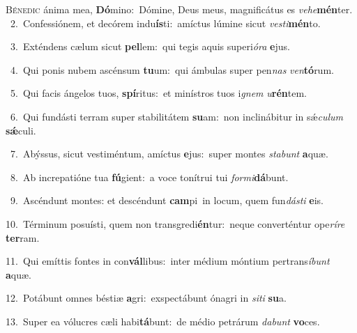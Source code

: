 \lettrine{\initial\textcolor{\initialcolor}{B}}{énedic} ánima mea, \textbf{Dó}\-mino:~\star Dómine, Deus meus, magnificátus es \textit{ve}\-\textit{he}\textbf{mén}ter.\\
{\numbfont\textcolor{\numbcolor}{~2.}}~Confessiónem, et decórem indu\-\textbf{ís}\-ti:~\star amíctus lúmine sicut \textit{ves}\-\textit{ti}\textbf{mén}to.\par
{\numbfont\textcolor{\numbcolor}{~3.}}~Exténdens cælum sicut \textbf{pel}\-lem:~\star qui tegis aquis superi\-\textit{ó}\-\textit{ra} \textbf{e}\-jus.\par
{\numbfont\textcolor{\numbcolor}{~4.}}~Qui ponis nubem ascénsum \textbf{tu}\-um:~\star qui ámbulas super pen\textit{nas} \textit{ven}\-\textbf{tó}rum.\par
{\numbfont\textcolor{\numbcolor}{~5.}}~Qui facis ángelos tuos, \textbf{spí}\-ritus:~\star et minístros tuos i\textit{gnem} \textit{u}\-\textbf{rén}tem.\par
{\numbfont\textcolor{\numbcolor}{~6.}}~Qui fundásti terram super stabilitátem \textbf{su}\-am:~\star non inclinábitur in sǽ\-\textit{cu}\-\textit{lum} \textbf{sǽ}\-culi.\par
{\numbfont\textcolor{\numbcolor}{~7.}}~Abýssus, sicut vestiméntum, amíctus \textbf{e}\-jus:~\star super montes \textit{sta}\-\textit{bunt} \textbf{a}\-quæ.\par
{\numbfont\textcolor{\numbcolor}{~8.}}~Ab increpatióne tua \textbf{fú}\-gient:~\star a voce tonítrui tui \textit{for}\-\textit{mi}\textbf{dá}bunt.\par
{\numbfont\textcolor{\numbcolor}{~9.}}~Ascéndunt montes: et descéndunt \textbf{cam}\-pi~\star in locum, quem fun\-\textit{dás}\-\textit{ti} \textbf{e}\-is.\par
{\numbfont\textcolor{\numbcolor}{10.}}~Términum posuísti, quem non transgredi\-\textbf{én}\-tur:~\star neque converténtur ope\-\textit{rí}\-\textit{re} \textbf{ter}\-ram.\par
{\numbfont\textcolor{\numbcolor}{11.}}~Qui emíttis fontes in con\-\textbf{vál}\-libus:~\star inter médium móntium pertrans\-\textit{í}\-\textit{bunt} \textbf{a}\-quæ.\par
{\numbfont\textcolor{\numbcolor}{12.}}~Potábunt omnes béstiæ \textbf{a}\-gri:~\star exspectábunt ónagri in \textit{si}\-\textit{ti} \textbf{su}\-a.\par
{\numbfont\textcolor{\numbcolor}{13.}}~Super ea vólucres cæli habi\-\textbf{tá}\-bunt:~\star de médio petrárum \textit{da}\-\textit{bunt} \textbf{vo}\-ces.\par
